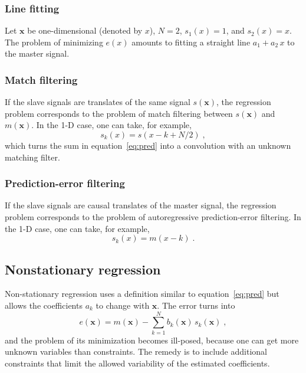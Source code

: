 \subsubsection{Line fitting} 
Let $\mathbf{x}$ be one-dimensional (denoted by $x$), $N=2$,
$s_1(x)=1$, and $s_2(x)=x$. The problem of minimizing $e(x)$ amounts
to fitting a straight line $a_1 + a_2\,x$ to the master signal.

\subsubsection{Match filtering}
If the slave signals are translates of the same signal
$s(\mathbf{x})$, the regression problem corresponds to the problem of
match filtering between $s(\mathbf{x})$ and $m(\mathbf{x})$. In the
1-D case, one can take, for example, 
\[
s_k(x)=s(x-k+N/2)\;,
\] which turns the sum in equation~\ref{eq:pred} into a convolution
with an unknown matching filter.

\subsubsection{Prediction-error filtering}
If the slave signals are causal translates of the master signal, the
regression problem corresponds to the problem of autoregressive
prediction-error filtering.  In the 1-D case, one can take, for
example, 
\[
s_k(x) = m(x-k)\;.
\]

\subsection{Nonstationary regression}
Non-stationary regression uses a definition similar to
equation~\ref{eq:pred} but allows the coefficients $a_k$ to change
with $\mathbf{x}$. The error turns into
\begin{equation}
  \label{eq:pred2}
  e(\mathbf{x}) = m(\mathbf{x}) - 
  \sum_{k=1}^{N} b_k(\mathbf{x})\,s_k(\mathbf{x})\;,
\end{equation}
and the problem of its minimization becomes ill-posed, because one can
get more unknown variables than constraints. The remedy is to include
additional constraints that limit the allowed variability of the
estimated coefficients.

